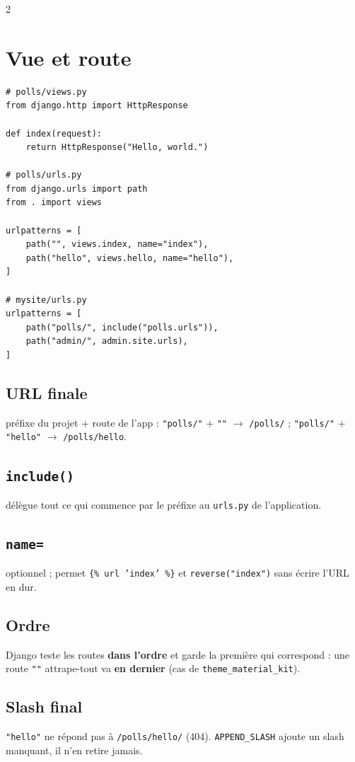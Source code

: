 \documentclass[a4paper,10pt]{article}
\newcommand{\co}[1]{\texttt{\textcolor{codefg}{#1}}}
\begin{document}
\begin{multicols}{2}
\section{Vue et route}

\begin{lstlisting}
# polls/views.py
from django.http import HttpResponse

def index(request):
    return HttpResponse("Hello, world.")

# polls/urls.py
from django.urls import path
from . import views

urlpatterns = [
    path("", views.index, name="index"),
    path("hello", views.hello, name="hello"),
]

# mysite/urls.py
urlpatterns = [
    path("polls/", include("polls.urls")),
    path("admin/", admin.site.urls),
]
\end{lstlisting}

\subsection{URL finale} préfixe du projet + route de l'app :
\co{"polls/"} + \co{""} $\to$ \co{/polls/} ;
\co{"polls/"} + \co{"hello"} $\to$ \co{/polls/hello}.

\subsection{\co{include()}} délègue tout ce qui commence par le préfixe au
\co{urls.py} de l'application.

\subsection{\co{name=}} optionnel ; permet \co{\{\% url 'index' \%\}} et
\co{reverse("index")} sans écrire l'URL en dur.

\subsection{Ordre} Django teste les routes \textbf{dans l'ordre} et garde la
première qui correspond : une route \co{""} attrape-tout va \textbf{en
dernier} (cas de \co{theme\_material\_kit}).

\subsection{Slash final} \co{"hello"} ne répond pas à \co{/polls/hello/}
(404). \co{APPEND\_SLASH} ajoute un slash manquant, il n'en retire jamais.


\end{multicols}
\end{document}
